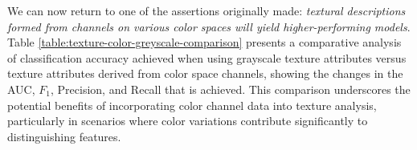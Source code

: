 \documentclass[letterpaper, notitlepage]{report}
\begin{document}
%
%


%

%
%
%

We can now return to one of the assertions originally made: \textit{textural descriptions formed from channels on various color spaces will yield higher-performing models}. Table \ref{table:texture-color-greyscale-comparison} presents a comparative analysis of classification accuracy achieved when using grayscale texture attributes versus texture attributes derived from color space channels, showing the changes in the AUC, ${F}_1$, Precision, and Recall that is achieved. This comparison underscores the potential benefits of incorporating color channel data into texture analysis, particularly in scenarios where color variations contribute significantly to distinguishing features.  
{
\renewcommand{\arraystretch}{0.9}

%
%

}
\end{document}
